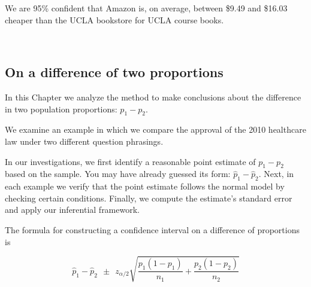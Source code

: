We are 95\% confident that Amazon is, on average, between \$9.49 and \$16.03 cheaper than the UCLA bookstore for UCLA course books.









\hfill\\

{\color{red}{FILL UP}}

\vfill


\pagebreak



\subsection{On a difference of two proportions}
\label{differenceOfTwoProportions}


In this Chapter we analyze the method to make conclusions about the difference in two population proportions: $p_1 - p_2$. 

We examine an example in which we compare the approval of the 2010 healthcare law under two different question phrasings.

In our investigations, we first identify a reasonable point estimate of $p_1 - p_2$ based on the sample. You may have already guessed its form: $\hat{p}_1 - \hat{p}_2$. Next, in each example we verify that the point estimate follows the normal model by checking certain conditions. Finally, we compute the estimate's standard error and apply our inferential framework.


The formula for constructing a confidence interval on a difference of proportions is

\begin{termBox}{
\begin{equation}
\hat{p}_{1} - \hat{p}_{2}	~~ \pm ~~		z_{\alpha / 2}  
\sqrt{ \frac{p_1(1-p_1)}{n_1}  +  \frac{p_2(1-p_2)}{n_2} }\label{eqnCIDiffProps}
\end{equation}
}
\end{termBox}


